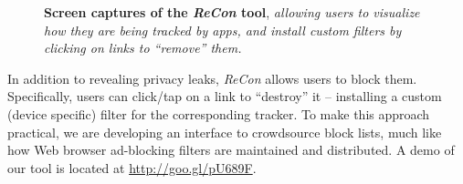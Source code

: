 \begin{figure}[tb]
\hspace{0.1in}
\caption{\textbf{Screen captures of the \emph{ReCon} tool}, \emph{allowing users to visualize how they are being tracked by apps, and install custom filters by clicking on links to ``remove'' them.} }
\label{fig:recon}
\vspace{\postfigspace}
\end{figure}

In addition to revealing privacy leaks, \emph{ReCon} allows users to block them. 
Specifically, users can click/tap on a link to ``destroy'' it -- installing a  custom (device specific) filter for the corresponding tracker. 
 
To make this approach practical, we are developing an interface to crowdsource block lists, much like how Web browser ad-blocking filters are maintained and distributed. 
A demo of our tool is located at \url{http://goo.gl/pU689F}. 

